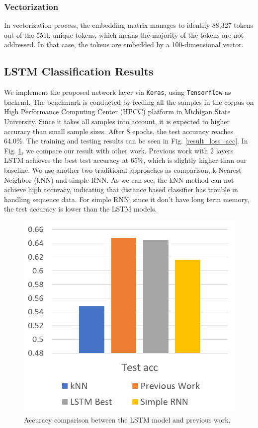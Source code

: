 \documentclass[11pt]{article}
\begin{document}
\subsubsection{Vectorization}

In vectorization process, the embedding matrix manages to identify 88,327 tokens out of the 551k unique tokens, which means the majority of the tokens are not addressed. In that case, the tokens are embedded by a 100-dimensional vector.

\subsection{LSTM Classification Results}

We implement the proposed network layer via \texttt{Keras}, using \texttt{Tensorflow} as backend. The benchmark is conducted by feeding all the samples in the corpus on High Performance Computing Center (HPCC) platform in Michigan State University. Since it takes all samples into account, it is expected to higher accuracy than small sample sizes. After 8 epochs, the test accuracy reaches 64.0\%. The training and testing results can be seen in Fig. \ref{result_loss_acc}. In Fig. \ref{result_acc_comp}, we compare our result with other work. Previous work with 2 layers LSTM achieves the best test accuracy at 65\%, which is slightly higher than our baseline. We use another two traditional approaches as comparison, k-Nearest Neighbor (kNN) and simple RNN. As we can see, the kNN method can not achieve high accuracy, indicating that distance based classifier has trouble in handling sequence data. For simple RNN, since it don't have long term memory, the test accuracy is lower than the LSTM models. 

\begin{figure}[tbp]
    \centering
    \includegraphics[width=0.9\linewidth]{./figures/acc_comp.png}
    \caption{Accuracy comparison between the LSTM model and previous work.}
    \label{result_acc_comp}
\end{figure}
\end{document}
